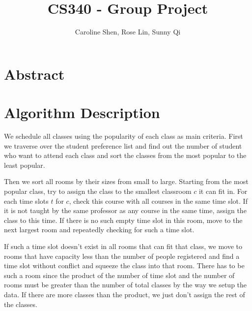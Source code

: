 \documentclass[11pt, oneside]{article}   	%
\title{CS340 - Group Project}
\author{Caroline Shen, Rose Lin, Sunny Qi}
\date{}							%
\begin{document}
\maketitle
\section{Abstract}


\newpage
\section{Algorithm Description}
We schedule all classes using the popularity of each class as main criteria. First we traverse over the student preference list and find out the number of student who want to attend each class and sort the classes from the most popular to the least popular. 

Then we sort all rooms by their sizes from small to large. Starting from the most popular class, try to assign the class to the smallest classroom $c$ it can fit in. For each time slots $t$ for $c$, check this course with all courses in the same time slot. If it is not taught by the same professor as any course in the same time, assign the class to this time. If there is no such empty time slot in this room, move to the next largest room and repeatedly checking for such a time slot. 

If such a time slot doesn't exist in all rooms that can fit that class, we move to rooms that have capacity less than the number of people registered and find a time slot without conflict and squeeze the class into that room. There has to be such a room since the product of the number of time slot and the number of rooms must be greater than the number of total classes by the way we setup the data. If there are more classes than the product, we just don't assign the rest of the classes.
\end{document}
